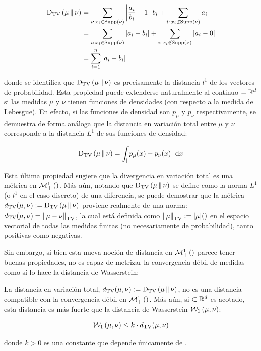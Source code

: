 \begin{align*}
	\operatorname{D_{TV}}\left(\mu\,\|\,\nu\right) & = \sum_{i:\, x_i\in\operatorname{Supp}\left(\nu\right)} \left|\frac{a_i}{b_i} - 1\right|\, b_i + \sum_{i:\, x_i\not\in\operatorname{Supp}\left(\nu\right)} a_i \\
	              & = \sum_{i:\, x_i\in\operatorname{Supp}\left(\nu\right)} |a_i - b_i| + \sum_{i:\, x_i\not\in\operatorname{Supp}\left(\nu\right)} |a_i - 0|                      \\
	              & = \sum_{i=1}^n |a_i - b_i|
\end{align*}

donde se identifica que $\operatorname{D_{TV}}\left(\mu\,\|\,\nu\right)$ es precisamente la distancia $l^1$ de los vectores de probabilidad. Esta propiedad puede extenderse naturalmente al continuo $=\mathbb{R}^d$ si las medidas $\mu$ y $\nu$ tienen funciones de densidades (con respecto a la medida de Lebesgue). En efecto, si las funciones de densidad son $p_\mu$ y $p_\nu$ respectivamente, se demuestra de forma análoga que la distancia en variación total entre $\mu$ y $\nu$ corresponde a la distancia $L^1$ de sus funciones de densidad:

\begin{equation*}
	\operatorname{D_{TV}}\left(\mu\,\|\,\nu\right) = \int_ |p_\mu(x) - p_\nu(x)| \,\operatorname{d}\! x
\end{equation*}

Esta última propiedad sugiere que la divergencia en variación total es una métrica en $\mathcal{M}_+^1\left(\right)$. Más aún, notando que $\operatorname{D_{TV}}\left(\mu\,\|\,\nu\right)$ se define como la norma $L^1$ (o $l^1$ en el caso discreto) de una diferencia, se puede demostrar que la métrica $d_{\operatorname{TV}}(\mu,\nu) := \operatorname{D_{TV}}\left(\mu\,\|\,\nu\right)$ proviene realmente de una norma: $d_{\operatorname{TV}}(\mu,\nu) = \left\lVert \mu-\nu \right\rVert_{\operatorname{TV}}$, la cual está definida como $\left\lVert \mu \right\rVert_{\operatorname{TV}} := |\mu|()$ en el espacio vectorial de todas las medidas finitas (no necesariamente de probabilidad), tanto positivas como negativas.

Sin embargo, si bien esta nueva noción de distancia en $\mathcal{M}_+^1\left(\right)$ parece tener buenas propiedades, no es capaz de metrizar la convergencia débil de medidas como sí lo hace la distancia de Wasserstein:

\begin{prop}
	La distancia en variación total, $d_{\operatorname{TV}}(\mu,\nu) := \operatorname{D_{TV}}\left(\mu\,\|\,\nu\right)$, no es una distancia compatible con la convergencia débil en $\mathcal{M}_+^1\left(\right)$. Más aún, si $\subset\mathbb{R}^d$ es acotado, esta distancia es más fuerte que la distancia de Wasserstein $\mathcal{W}_{1}\left(\mu,\nu\right)$:

	\begin{equation*}
		\mathcal{W}_{1}\left(\mu,\nu\right) \leq k\cdot d_{\operatorname{TV}}(\mu,\nu)
	\end{equation*}

	donde $k>0$ es una constante que depende únicamente de $\xspace$.
\end{prop}

